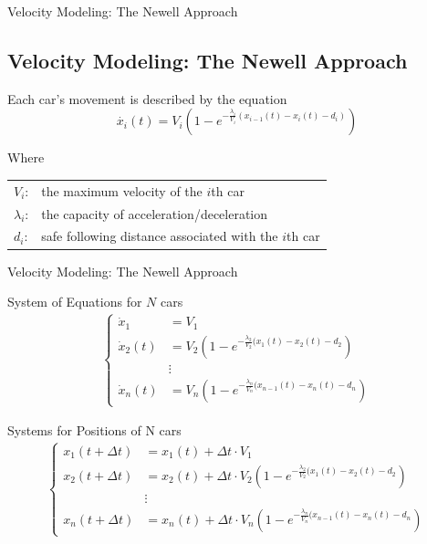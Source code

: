 \documentclass{beamer}
\begin{document}
\begin{frame}{Velocity Modeling: The Newell Approach}
\subsection{Velocity Modeling: The Newell Approach}

\begin{alertblock}{Each car's movement is described by the equation}
	\[
	\boxed{\dot{x_i}(t) = V_i\left( 1 - e^{-\frac{\lambda_i}{V_i}(x_{i-1}(t) - x_i(t) - d_i)}\right) }
	\]
\end{alertblock}

\begin{block}{Where}
	\begin{center}
		\begin{tabular}{l l}
			\(V_i\): & the maximum velocity of the \(i\)th car \\
			\(\lambda_i\): & the capacity of acceleration/deceleration \\
			\(d_i\): & safe following distance associated with the \(i\)th car \\
		\end{tabular}
	\end{center}
\end{block}

\end{frame}
\begin{frame}{Velocity Modeling: The Newell Approach}
		\vspace{-0.3cm}
    	\begin{block}{System of Equations for $N$ cars}
    	\begin{align*}
    		\left\{
    		\begin{array}{ll}
    			\dot{x}_1 &= V_1 \\
    			\dot{x}_2(t) &= V_2(1-e^{-\frac{\lambda_2}{V_2}(x_{1}(t) - x_2(t) - d_2}) \\
    			&\vdots \\
    			\dot{x}_n(t) &= V_n(1-e^{-\frac{\lambda_n}{V_n}(x_{n-1}(t) - x_n(t) - d_n})
    		\end{array}
    		\right.
    	\end{align*}
    \end{block}
    \vspace{-0.3cm}
    \begin{block}{Systems for Positions of N cars}
    	\begin{align*}
    		\left\{
    		\begin{array}{ll}
    			x_1(t + \Delta t) &= x_1(t) + \Delta t \cdot  V_1\\
    			x_2(t + \Delta t) &= x_2(t) + \Delta t \cdot V_2(1-e^{-\frac{\lambda_2}{V_2}(x_{1}(t) - x_2(t) - d_2}) \\
    			&\vdots \\
    			x_n(t + \Delta t) &= x_n(t) + \Delta t \cdot V_n(1-e^{-\frac{\lambda_n}{V_n}(x_{n-1}(t) - x_n(t) - d_n})
    		\end{array}
    		\right.
    	\end{align*}
    \end{block}
\end{frame}
\end{document}
